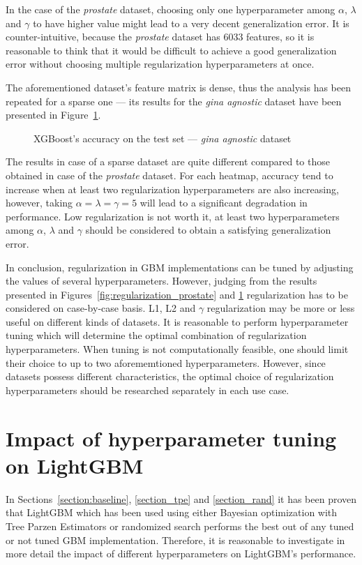 \documentclass[magisterska, english]{pwr_wmat_praca_dyplomowa}
\theoremstyle{plain}
\numberwithin{theorem}{chapter}
\theoremstyle{definition}
\numberwithin{theorem}{chapter}
\begin{document}
In the case of the \emph{prostate} dataset, choosing only one hyperparameter among $\alpha$, $\lambda$ and $\gamma$ to have higher value might lead to a very decent generalization error. It is counter-intuitive, because the \emph{prostate} dataset has 6033 features, so it is reasonable to think that it would be difficult to achieve a good generalization error without choosing multiple regularization hyperparameters at once. 

The aforementioned dataset's feature matrix is dense, thus the analysis has been repeated for a sparse one --- its results for the \emph{gina agnostic} dataset have been presented in Figure~\ref{fig:regularization_gina_agnostic}.

\begin{figure}[H]
	\centering
	\caption{XGBoost's accuracy on the test set --- \emph{gina agnostic} dataset}
	\label{fig:regularization_gina_agnostic}
\end{figure}

The results in case of a sparse dataset are quite different compared to those obtained in case of the \emph{prostate} dataset. For each heatmap, accuracy tend to increase when at least two regularization hyperparameters are also increasing, however, taking $\alpha=\lambda=\gamma=5$ will lead to a significant degradation in performance. Low regularization is not worth it, at least two hyperparameters among $\alpha$, $\lambda$ and $\gamma$ should be considered to obtain a satisfying generalization error. 

In conclusion, regularization in GBM implementations can be tuned by adjusting the values of several hyperparameters. However, judging from the results presented in Figures~\ref{fig:regularization_prostate} and \ref{fig:regularization_gina_agnostic} regularization has to be considered on case-by-case basis. L1, L2 and $\gamma$ regularization may be more or less useful on different kinds of datasets. It is reasonable to perform hyperparameter tuning which will determine the optimal combination of regularization hyperparameters. When tuning is not computationally feasible, one should limit their choice to up to two aforememtioned hyperparameters. However, since datasets possess different characteristics, the optimal choice of regularization hyperparameters should be researched separately in each use case.

\section{Impact of hyperparameter tuning on LightGBM}\label{section:lightgbm_tuning}
In Sections~\ref{section:baseline}, \ref{section_tpe} and \ref{section_rand} it has been proven that LightGBM which has been used using either Bayesian optimization with Tree Parzen Estimators or randomized search performs the best out of any tuned or not tuned GBM implementation. Therefore, it is reasonable to investigate in more detail the impact of different hyperparameters on LightGBM's performance. 
\end{document}
